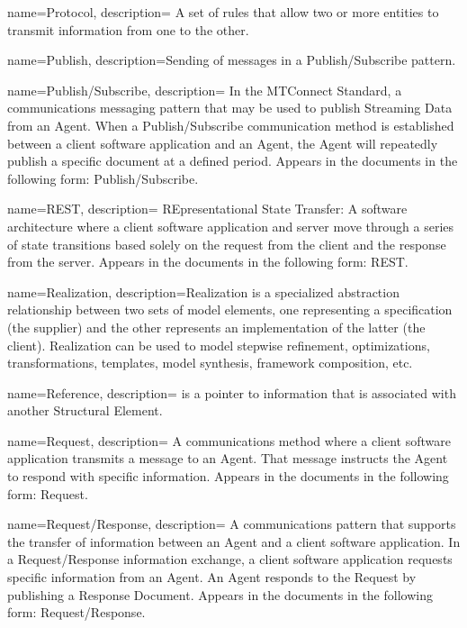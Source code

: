 {
    name={Protocol},
	description={
	A set of rules that allow two or more entities to transmit information from one to the other.
}
}

{
    name={Publish},
	description={Sending of messages in a \gls{Publish/Subscribe} pattern.}
}

{
    name={Publish/Subscribe},
	description={
	In the MTConnect Standard, a communications messaging pattern that may be used to publish \gls{Streaming Data} from an \gls{Agent}.  When a \gls{Publish/Subscribe} communication method is established between a client software application and an \gls{Agent}, the \gls{Agent} will repeatedly publish a specific  document at a defined period.
	Appears in the documents in the following form: \gls{Publish/Subscribe}.
}
}

{
    name={REST},
	description={
	REpresentational State Transfer:  A software architecture where a client software application and server move through a series of state transitions based solely on the request from the client and the response from the server. 
	Appears in the documents in the following form: REST.
}
}

{
    name={Realization},
	description={Realization is a specialized abstraction relationship between two sets of model elements, one representing a specification (the supplier) and the other represents an implementation of the latter (the client). Realization can be used to model stepwise refinement, optimizations, transformations, templates, model synthesis, framework composition, etc.}
}

{
    name={Reference},
	description={ is a pointer to information that is associated with another \gls{Structural Element}.}
}

{
    name={Request},
	description={
	A communications method where a client software application transmits a message to an \gls{Agent}.  That message instructs the \gls{Agent} to respond with specific information.
	Appears in the documents in the following form: \gls{Request}.
}
}

{
    name={Request/Response},
	description={
	A communications pattern that supports the transfer of information between an \gls{Agent} and a client software application. In a \gls{Request/Response} information exchange, a client software application requests specific information from an \gls{Agent}. An \gls{Agent} responds to the \gls{Request} by publishing a \gls{Response Document}.   
	Appears in the documents in the following form: \gls{Request/Response}.
}
}


